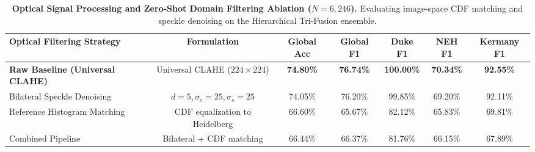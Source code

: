 \documentclass{article}
\begin{document}
\begin{table}[t]
\centering
\small
\caption{\textbf{Optical Signal Processing and Zero-Shot Domain Filtering Ablation ($N = 6,246$).} Evaluating image-space CDF matching and speckle denoising on the Hierarchical Tri-Fusion ensemble.}
\label{tab:optical_filters}
\begin{tabular}{lcccccc}
\toprule
\textbf{Optical Filtering Strategy} & \textbf{Formulation} & \textbf{Global Acc} & \textbf{Global F1} & \textbf{Duke F1} & \textbf{NEH F1} & \textbf{Kermany F1} \\
\midrule
\textbf{Raw Baseline (Universal CLAHE)} & Universal CLAHE ($224 \times 224$) & \textbf{74.80\%} & \textbf{76.74\%} & \textbf{100.00\%} & \textbf{70.34\%} & \textbf{92.55\%} \\
Bilateral Speckle Denoising & $d=5, \sigma_c=25, \sigma_s=25$ & 74.05\% & 76.20\% & 99.85\% & 69.20\% & 92.11\% \\
Reference Histogram Matching & CDF equalization to Heidelberg & 66.60\% & 65.67\% & 82.12\% & 65.83\% & 69.81\% \\
Combined Pipeline & Bilateral + CDF matching & 66.44\% & 66.37\% & 81.76\% & 66.15\% & 67.89\% \\
\bottomrule
\end{tabular}
\end{table}
\end{document}
